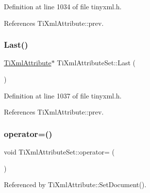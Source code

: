 Definition at line 1034 of file tinyxml.\+h.



References Ti\+Xml\+Attribute\+::prev.

\hypertarget{class_ti_xml_attribute_set_ab4c4edfb2d74f6ea31aae096743bd6e0}{}\label{class_ti_xml_attribute_set_ab4c4edfb2d74f6ea31aae096743bd6e0} 
\subsubsection{\texorpdfstring{Last()}{Last()}\hspace{0.1cm}{\footnotesize\ttfamily [2/2]}}
{\footnotesize\ttfamily \hyperlink{class_ti_xml_attribute}{Ti\+Xml\+Attribute}$\ast$ Ti\+Xml\+Attribute\+Set\+::\+Last (\begin{DoxyParamCaption}{ }\end{DoxyParamCaption})\hspace{0.3cm}{\ttfamily [inline]}}



Definition at line 1037 of file tinyxml.\+h.



References Ti\+Xml\+Attribute\+::prev.

\hypertarget{class_ti_xml_attribute_set_a977f5b50c94e7b6beb01875298fa14a2}{}\label{class_ti_xml_attribute_set_a977f5b50c94e7b6beb01875298fa14a2} 
\subsubsection{\texorpdfstring{operator=()}{operator=()}}
{\footnotesize\ttfamily void Ti\+Xml\+Attribute\+Set\+::operator= (\begin{DoxyParamCaption}\item[{const \hyperlink{class_ti_xml_attribute_set}{Ti\+Xml\+Attribute\+Set} \&}]{ }\end{DoxyParamCaption})\hspace{0.3cm}{\ttfamily [private]}}



Referenced by Ti\+Xml\+Attribute\+::\+Set\+Document().

\hypertarget{class_ti_xml_attribute_set_a924a73d071f2573f9060f0be57879c57}{}\label{class_ti_xml_attribute_set_a924a73d071f2573f9060f0be57879c57} 
